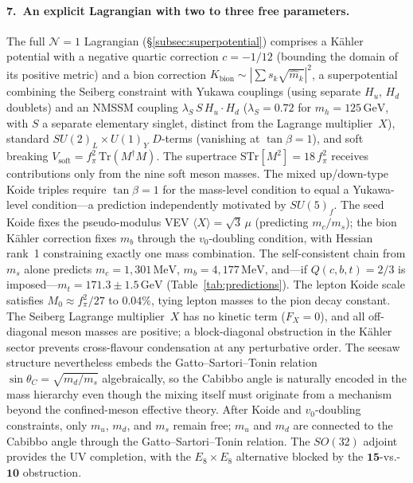 \documentclass[12pt,a4paper]{article}
\newcommand{\MeV}{\,\text{MeV}}
\newcommand{\GeV}{\,\text{GeV}}
\newcommand{\fpi}{f_\pi}
\begin{document}
\paragraph{7.\ An explicit Lagrangian with two to three free parameters.}
The full $\mathcal{N}=1$ Lagrangian
(\S\ref{subsec:superpotential}) comprises a K\"ahler potential
with a negative quartic correction $c=-1/12$ (bounding the domain
of its positive metric) and a bion correction
$K_{\text{bion}} \sim |\!\sum s_k\sqrt{\hat m_k}|^2$,
a superpotential combining the Seiberg constraint
with Yukawa couplings (using separate $H_u$, $H_d$ doublets)
and an NMSSM coupling $\lambda_S\,S\,H_u\!\cdot\!H_d$
($\lambda_S = 0.72$ for $m_h = 125\GeV$, with $S$ a separate
elementary singlet, distinct from the Lagrange multiplier~$X$),
standard $SU(2)_L \times U(1)_Y$ $D$-terms
(vanishing at $\tan\beta = 1$),
and soft breaking $V_{\text{soft}} = \fpi^2\,\text{Tr}(M^\dagger M)$.
The supertrace $\text{STr}[M^2] = 18\,\fpi^2$
receives contributions only from the nine soft meson masses.
The mixed up/down-type Koide triples require $\tan\beta = 1$
for the mass-level condition to equal a Yukawa-level
condition---a prediction independently motivated by $SU(5)_f$.
The seed Koide fixes the
pseudo-modulus VEV $\langle X\rangle = \sqrt{3}\,\mu$ (predicting $m_c/m_s$); the
bion K\"ahler correction fixes $m_b$ through the
$v_0$-doubling condition, with Hessian rank~1 constraining
exactly one mass combination.  The self-consistent chain from $m_s$ alone predicts
$m_c = 1{,}301\MeV$, $m_b = 4{,}177\MeV$, and---if
$Q(c,b,t) = 2/3$ is imposed---$m_t = 171.3 \pm 1.5\GeV$
(Table~\ref{tab:predictions}).
The lepton Koide scale satisfies $M_0 \approx \fpi^2/27$
to $0.04\%$, tying lepton masses to the pion decay constant.
The Seiberg Lagrange multiplier~$X$ has no kinetic term
($F_X = 0$), and all off-diagonal meson masses are positive;
a block-diagonal obstruction in the K\"ahler sector prevents
cross-flavour condensation at any perturbative order.
The seesaw structure nevertheless embeds the Gatto--Sartori--Tonin
relation $\sin\theta_C = \sqrt{m_d/m_s}$ algebraically,
so the Cabibbo angle is naturally encoded in the mass hierarchy
even though the mixing itself must originate from a mechanism
beyond the confined-meson effective theory.
After Koide and $v_0$-doubling constraints,
only $m_u$, $m_d$, and $m_s$ remain free; $m_u$ and
$m_d$ are connected to the Cabibbo angle through the
Gatto--Sartori--Tonin relation.  The $SO(32)$ adjoint provides the UV completion,
with the $E_8 \times E_8$ alternative blocked by the
$\mathbf{15}$-vs.-$\mathbf{10}$ obstruction.
\end{document}
